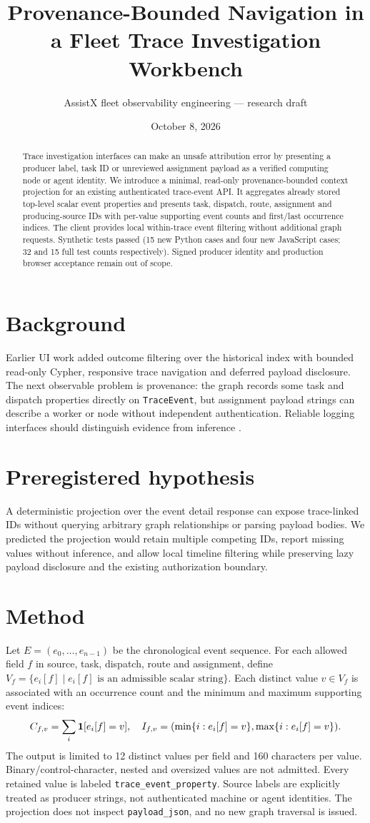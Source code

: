 \documentclass[11pt]{article}
\title{Provenance-Bounded Navigation in a Fleet Trace Investigation Workbench}
\author{AssistX fleet observability engineering --- research draft}
\date{October 8, 2026}
\begin{document}
\maketitle
\begin{abstract}
Trace investigation interfaces can make an unsafe attribution error by presenting a producer label, task ID or unreviewed assignment payload as a verified computing node or agent identity. We introduce a minimal, read-only provenance-bounded context projection for an existing authenticated trace-event API. It aggregates already stored top-level scalar event properties and presents task, dispatch, route, assignment and producing-source IDs with per-value supporting event counts and first/last occurrence indices. The client provides local within-trace event filtering without additional graph requests. Synthetic tests passed (15 new Python cases and four new JavaScript cases; 32 and 15 full test counts respectively). Signed producer identity and production browser acceptance remain out of scope.
\end{abstract}
\section{Background}
Earlier UI work added outcome filtering over the historical index with bounded read-only Cypher, responsive trace navigation and deferred payload disclosure. The next observable problem is provenance: the graph records some task and dispatch properties directly on \texttt{TraceEvent}, but assignment payload strings can describe a worker or node without independent authentication. Reliable logging interfaces should distinguish evidence from inference \cite{nist92}.
\section{Preregistered hypothesis}
A deterministic projection over the event detail response can expose trace-linked IDs without querying arbitrary graph relationships or parsing payload bodies. We predicted the projection would retain multiple competing IDs, report missing values without inference, and allow local timeline filtering while preserving lazy payload disclosure and the existing authorization boundary.
\section{Method}
Let $E=(e_0,\dots,e_{n-1})$ be the chronological event sequence. For each allowed field $f$ in source, task, dispatch, route and assignment, define $V_f=\{e_i[f]\mid e_i[f]\text{ is an admissible scalar string}\}$. Each distinct value $v\in V_f$ is associated with an occurrence count and the minimum and maximum supporting event indices:
\[
C_{f,v} = \sum_i {\bf 1}[e_i[f]=v],\quad
I_{f,v} = (\min\{i:e_i[f]=v\},\max\{i:e_i[f]=v\}).
\]
The output is limited to 12 distinct values per field and 160 characters per value. Binary/control-character, nested and oversized values are not admitted. Every retained value is labeled \texttt{trace\_event\_property}. Source labels are explicitly treated as producer strings, not authenticated machine or agent identities. The projection does not inspect \texttt{payload\_json}, and no new graph traversal is issued.
\end{document}

